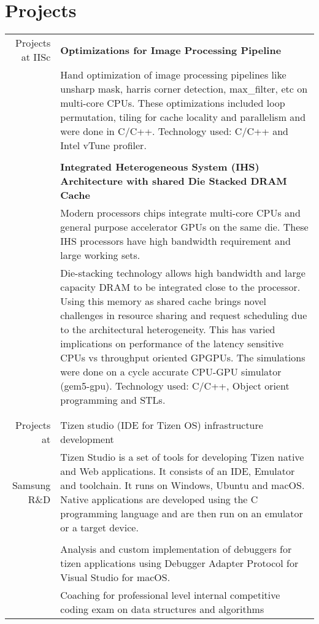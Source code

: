 \documentclass[a4paper,10pt]{article} %
\begin{document}
\section{Projects}
\begin{tabular}{rp{13cm}}
Projects at IISc& \textbf{Optimizations for Image Processing Pipeline} \\
& \setlength{\leftskip}{0.4cm}
Hand optimization of image processing pipelines like unsharp mask, harris corner detection, max\_filter, etc on multi-core CPUs. These optimizations included loop permutation, tiling for cache locality and parallelism and were done in C/C++. Technology used: C/C++ and Intel vTune profiler.\\
&\\
& \textbf{Integrated Heterogeneous System (IHS) Architecture with shared Die Stacked DRAM Cache} \\
& \setlength{\leftskip}{0.4cm}
Modern processors chips integrate multi-core CPUs and general purpose accelerator GPUs on the same die. These IHS processors have high bandwidth requirement and large working sets.\\
& \setlength{\leftskip}{0.4cm} 
Die-stacking technology allows high bandwidth and large capacity DRAM to be
integrated close to the processor. Using this memory as shared cache brings
novel challenges in resource sharing and request scheduling due to the
architectural heterogeneity. This has varied implications on performance of the
latency sensitive CPUs vs throughput oriented GPGPUs. The simulations were done
on a cycle accurate CPU-GPU simulator (gem5-gpu). Technology used: C/C++, Object orient programming and STLs.\\
&\\
&\\
Projects at  &  Tizen studio (IDE for Tizen OS) infrastructure development \\
Samsung R\&D & Tizen Studio is a set of tools for developing Tizen native and Web applications. It consists of an IDE, Emulator and toolchain. It runs on Windows, Ubuntu and macOS. Native applications are developed using the C programming language and are then run on an emulator or a target device. \\
&\\
& Analysis and custom implementation of debuggers for tizen applications using Debugger Adapter Protocol for Visual Studio for macOS.  
\\
& Coaching for professional level internal competitive coding exam on data 
structures and algorithms \\

\end{tabular}
\end{document}
